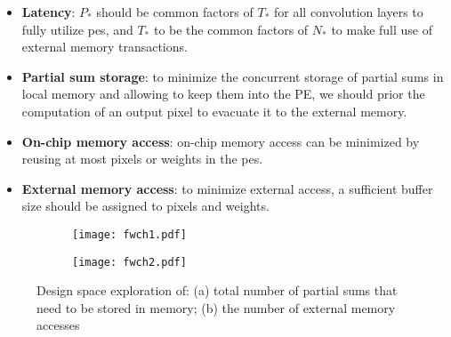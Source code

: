 \begin{itemize}
    \item \textbf{Latency}: $P_*$ should be common factors of  $T_*$ for all convolution layers to fully utilize \acrshort{pe}s, and $T_*$ to be the common factors of  $N_*$ to make full use of external memory transactions.
    \item \textbf{Partial sum storage}: to minimize the concurrent storage of partial sums in local memory and allowing to keep them into the PE, we should prior the computation of an output pixel to evacuate it to the external memory.
    \item \textbf{On-chip memory access}: on-chip memory access can be minimized by reusing at most pixels or weights in the \acrshort{pe}s.
    \item \textbf{External memory access}: to minimize external access, a sufficient buffer size should be assigned to pixels and weights.
\end{itemize}
%
\begin{figure}
\centering
    \begin{subfigure}{.45\textwidth}
    \centering
    \texttt{[image: fwch1.pdf]}
    \caption{ }
    \end{subfigure}
    \begin{subfigure}{.45\textwidth}
    \centering
    \texttt{[image: fwch2.pdf]}
    \caption{ }
    \end{subfigure}
    \caption{Design space exploration of: (a) total number of partial sums that need to be stored in memory; (b) the number of external memory accesses \cite{ma_optimizing_2018}}
    \label{fig:flowchart}
\end{figure}
